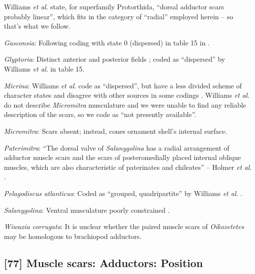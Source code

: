 \documentclass[openany]{book}
\theoremstyle{definition}
\theoremstyle{definition}
\theoremstyle{definition}
\theoremstyle{remark}
\begin{document}
Williams \emph{et al}.
\citeyearpar{Williams2000LinguliformeaCraniiformea} state, for
superfamily Protorthida, ``dorsal adductor scars probably linear'',
which fits in the category of ``radial'' employed herein -- so that's
what we follow.

\hypertarget{Gasconsia-coding-76}{}
\emph{Gasconsia}: Following coding with state 0 (dispersed) in table 15
in \citet{Williams2000LinguliformeaCraniiformea}.

\hypertarget{Glyptoria-coding-76}{}
\emph{Glyptoria}: Distinct anterior and posterior fields
\citep{Chen2007Reinterpretationof}; coded as ``dispersed'' by Williams
\emph{et al}. \citeyearpar{Williams2000LinguliformeaCraniiformea} in
table 15.

\hypertarget{Micrina-coding-76}{}
\emph{Micrina}: Williams \emph{et al}.
\citeyearpar{Williams1998Thediversity} code as ``dispersed'', but have a
less divided scheme of character states and disagree with other sources
in some codings \citep[e.g.][in
Kutorginates]{Bassett2001Functionalmorphology}. Williams \emph{et al}.
\citeyearpar{Williams2000LinguliformeaCraniiformea} do not describe
\emph{Micromitra} musculature and we were unable to find any reliable
description of the scars, so we code as ``not presently available''.

\hypertarget{Micromitra-coding-76}{}
\emph{Micromitra}: Scars absent; instead, cones ornament shell's
internal surface.

\hypertarget{Paterimitra-coding-76}{}
\emph{Paterimitra}: ``The dorsal valve of \emph{Salanygolina} has a
radial arrangement of adductor muscle scars and the scars of
posteromedially placed internal oblique muscles, which are also
characteristic of paterinates and chileates'' -- Holmer \emph{et al}.
\citeyearpar{Holmer2009Theenigmatic}.

\hypertarget{Pelagodiscus_atlanticus-coding-76}{}
\emph{Pelagodiscus atlanticus}: Coded as ``grouped, quadripartite'' by
Williams \emph{et al}. \citeyearpar{Williams1996Asupra}.

\hypertarget{Salanygolina-coding-76}{}
\emph{Salanygolina}: Ventral musculature poorly constrained
\citep{Williams2000LinguliformeaCraniiformea, Popov2009Earlyontogeny}.

\hypertarget{Wiwaxia_corrugata-coding-76}{}
\emph{Wiwaxia corrugata}: It is unclear whether the paired muscle scars
of \emph{Oikozetetes} may be homologous to brachiopod adductors.

\subsection*{{[}77{]} Muscle scars: Adductors:
Position}\label{muscle-scars-adductors-position}
\end{document}
